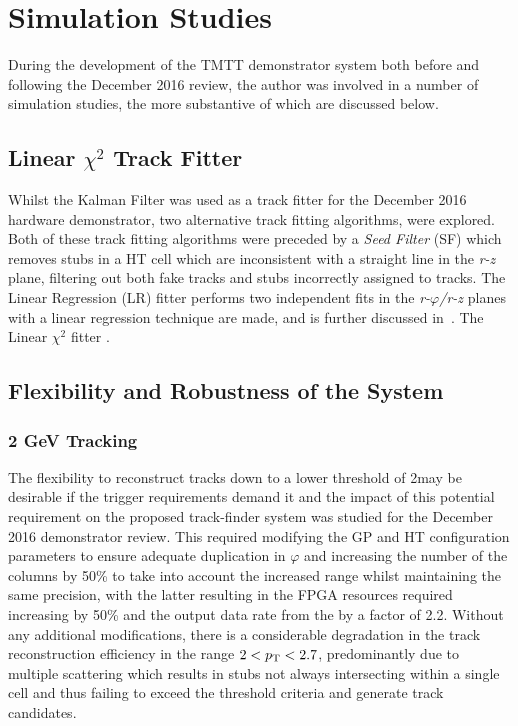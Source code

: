 \section{Simulation Studies}
During the development of the TMTT demonstrator system both before and following the December 2016 review, the author was involved in a number of simulation studies, the more substantive of which are discussed below.

\subsection{Linear $\chi^{2}$ Track Fitter}
Whilst the Kalman Filter was used as a track fitter for the December 2016 hardware demonstrator, two alternative track fitting algorithms, were explored.
Both of these track fitting algorithms were preceded by a \emph{Seed Filter} (SF) which removes stubs in a HT cell which are inconsistent with a straight line in the \emph{r-z} plane, filtering out both fake tracks and stubs incorrectly assigned to tracks.
The Linear Regression (LR) fitter performs two independent fits in the \emph{r-$\varphi$/r-z} planes with a linear regression technique are made, and is further discussed in~\cite{TMTT_FLP}.
The Linear $\chi^{2}$ fitter 
 .





\subsection{Flexibility and Robustness of the System}
\subsubsection{2 GeV Tracking}
The flexibility to reconstruct tracks down to a lower \pT threshold of 2\GeV may be desirable if the trigger requirements demand it and the impact of this potential requirement on the proposed track-finder system was studied for the December 2016 demonstrator review.
This required modifying the GP and HT configuration parameters to ensure adequate duplication in $\varphi$ and increasing the number of the \qpt columns by 50\% to take into account the increased \pt range whilst maintaining the same precision, with the latter resulting in the FPGA resources required increasing by 50\% and the output data rate from the \HT by a factor of 2.2.
Without any additional modifications, there is a considerable degradation in the track reconstruction efficiency in the range $2 < p_{\mathrm{T}} < 2.7$\GeVc, predominantly due to multiple scattering which results in stubs not always intersecting within a single \HT cell and thus failing to exceed the threshold criteria and generate track candidates.

